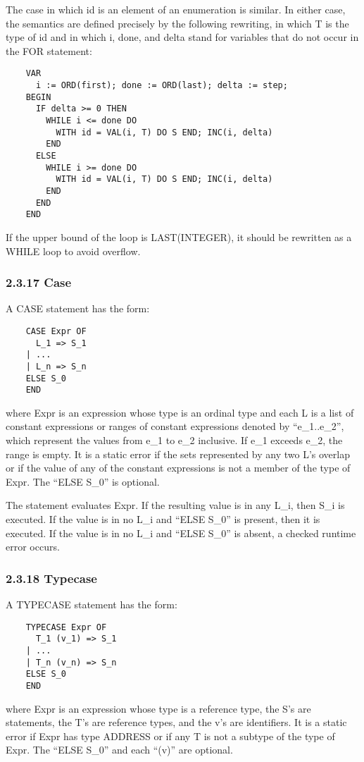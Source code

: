 \documentclass[10pt]{article}
\begin{document}
  The case in which id is an element of an enumeration is similar. In either case, the semantics are defined precisely by the following rewriting, in which T is the type of id and in which i, done, and delta stand for variables that do not occur in the FOR statement: 
\begin{verbatim}
    VAR
      i := ORD(first); done := ORD(last); delta := step;
    BEGIN
      IF delta >= 0 THEN
        WHILE i <= done DO 
          WITH id = VAL(i, T) DO S END; INC(i, delta)
        END
      ELSE
        WHILE i >= done DO
          WITH id = VAL(i, T) DO S END; INC(i, delta)
        END
      END
    END
\end{verbatim}



  If the upper bound of the loop is LAST(INTEGER), it should be rewritten as a WHILE loop to avoid overflow. 


 
\subsubsection*{2.3.17 Case}


  A CASE statement has the form: 
\begin{verbatim}
    CASE Expr OF  
      L_1 => S_1 
    | ...
    | L_n => S_n
    ELSE S_0 
    END
\end{verbatim}
 where Expr is an expression whose type is an ordinal type and each L is a list of constant expressions or ranges of constant expressions denoted by ``e\_1..e\_2'', which represent the values from e\_1 to e\_2 inclusive. If  e\_1 exceeds e\_2, the range is empty. It is a static error if the sets represented by any two L's overlap or if the value of any of the constant expressions is not a member of the type of Expr. The ``ELSE S\_0'' is optional. 


 The statement evaluates Expr. If the resulting value is in any L\_i, then S\_i is executed. If the value is in no L\_i and ``ELSE S\_0'' is present, then it is executed. If the value is in no L\_i and ``ELSE S\_0'' is absent, a checked runtime error occurs. 


 
\subsubsection*{2.3.18 Typecase}


  A TYPECASE statement has the form: 
\begin{verbatim}
    TYPECASE Expr OF
      T_1 (v_1) => S_1
    | ...
    | T_n (v_n) => S_n
    ELSE S_0
    END
\end{verbatim}
 where Expr is an expression whose type is a reference type, the S's are statements, the T's are reference types, and the v's are identifiers. It is a static error if  Expr has type ADDRESS or if any T is not a subtype of the type of Expr. The ``ELSE S\_0'' and each ``(v)'' are optional. 
\end{document}
